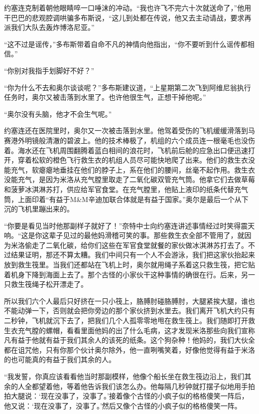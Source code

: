     约塞连克制着朝他眼睛啐一口唾沫的冲动。“我也许飞不完六十次就送命了，”他用干巴巴的悲观腔调哄骗多布斯说，“这儿到处都在传说，他又去主动请战，要求再派我们大队去轰炸博洛尼亚。”

    “这不过是谣传，”多布斯带着自命不凡的神情向他指出，“你不要听到什么谣传都相信。”

    “你别对我指手划脚好不好？”

    “你为什么不去和奥尔谈谈呢？”多布斯建议道，“上星期第二次飞到阿维尼翁执行任务时，奥尔又被击落到水里了。也许他很生气，正想干掉他呢。”

    “奥尔没有头脑，他才不会生气呢。”

    约塞连还在医院里时，奥尔又一次被击落到水里。他驾着受伤的飞机缓缓滑落到马赛港外明镜般清澈的碧波上。他的技术棒极了，机组的六个成员连一根毫毛也没伤着。海水还在飞机周围翻腾着蓝白相间的浪花时，飞机前后舱的应急出口便迅速打开，穿着松软的橙色飞行救生衣的机组人员尽可能快地爬了出来。他们的救生衣没能充气，软瘪瘪地垂挂在他们的脖子上，系在他们的腰间，丝毫不起作用。救生衣没能充气，是因为米洛从充气膛里取走了二氧化碳双管充气筒。他拿它们去做草莓和菠萝冰淇淋苏打，供应给军官食堂。在充气膛里，他贴上液印的纸条代替充气筒，上面印着“有益于M&M辛迪加联合体就是有益于国家。”奥尔是最后一个从下沉的飞机里蹦出来的。

    “你要是看见当时他那副样子就好了！”奈特中士向约塞连讲述事情经过时笑得震天响。“这是你这辈子见过的最他妈滑稽可笑的事。那些救生衣全部不管用了，就因为米洛偷走了二氧化碳，给你们这些在军官食堂就餐的家伙做冰淇淋苏打去了。不过结果证明，那还不算太糟。我们中间只有一个人不会游泳，我们把这家伙抬起来放到救生筏里。当我们还都站在飞机上时，奥尔就用绳子系着这只救生筏，把它贴着机身下降到海面上去了。那个古怪的小家伙干这种事情的确很在行。后来，另一只救生筏绳子松开漂走了。

 


    所以我们六个人最后只好挤在一只小筏上，胳膊肘碰胳膊肘，大腿紧挨大腿，谁也不能动弹一下，否则就会把你旁边的那个家伙挤到水里去。我们离开飞机大约只有二秒钟，飞机就沉下去了，把我们几个人孤零零地甩在救生筏上。我们随即打开救生衣充气膛的螺帽，看看里面他妈的出了什么毛病，这才发现米洛那些向我们宣称凡有益于他就有益于我们其余人的该死的纸条。这个狗杂种！他妈的，我们大伙全都在诅咒他，只有你那个伙计奥尔除外，他一直咧嘴笑着，好像他觉得有益于米洛的也可能真的有益于我们其余的人。

    “我发誓，你真应该看看他当时那副模样，他像个船长坐在救生筏边沿上，我们其余的人全都望着他，等着他告诉我们该怎么办。他每隔几秒钟就打摆子似地用手拍拍大腿说：‘现在没事了，没事了。’接着像个古怪的小疯子似的格格傻笑一阵后，他又说：‘现在没事了，没事了。’然后又像个古怪的小疯子似的格格傻笑一阵。

